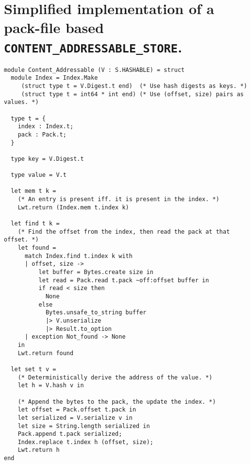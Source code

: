 \section{Simplified implementation of a pack-file based \texttt{CONTENT\_ADDRESSABLE\_STORE}.}
\label{app:pack-backend}

\begin{verbatim}
module Content_Addressable (V : S.HASHABLE) = struct
  module Index = Index.Make
     (struct type t = V.Digest.t end)  (* Use hash digests as keys. *)
     (struct type t = int64 * int end) (* Use (offset, size) pairs as values. *)

  type t = {
    index : Index.t;
    pack : Pack.t;
  }

  type key = V.Digest.t

  type value = V.t

  let mem t k =
    (* An entry is present iff. it is present in the index. *)
    Lwt.return (Index.mem t.index k)

  let find t k =
    (* Find the offset from the index, then read the pack at that offset. *)
    let found =
      match Index.find t.index k with
      | offset, size ->
          let buffer = Bytes.create size in
          let read = Pack.read t.pack ~off:offset buffer in
          if read < size then
            None
          else
            Bytes.unsafe_to_string buffer
            |> V.unserialize
            |> Result.to_option
      | exception Not_found -> None
    in
    Lwt.return found

  let set t v =
    (* Deterministically derive the address of the value. *)
    let h = V.hash v in

    (* Append the bytes to the pack, the update the index. *)
    let offset = Pack.offset t.pack in
    let serialized = V.serialize v in
    let size = String.length serialized in
    Pack.append t.pack serialized;
    Index.replace t.index h (offset, size);
    Lwt.return h
end
\end{verbatim}